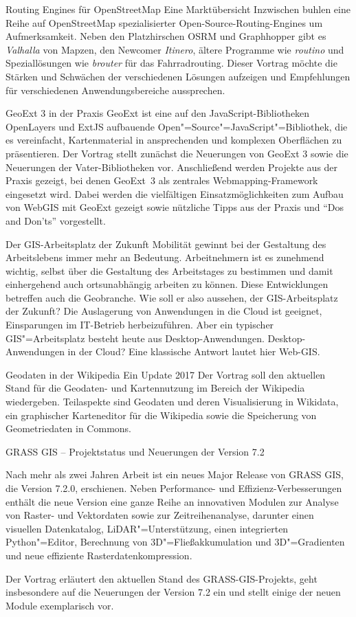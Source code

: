 %
{Routing Engines für OpenStreetMap}%
{Eine Marktübersicht}%
{Inzwischen buhlen eine Reihe auf OpenStreetMap spezialisierter Open-Source-Routing-Engines um
Aufmerksamkeit. Neben den Platzhirschen OSRM und Graphhopper gibt es \emph{Valhalla} von Mapzen, den
Newcomer \emph{Itinero}, ältere Programme wie \emph{routino} und Speziallösungen wie \emph{brouter} für das
Fahrradrouting. Dieser Vortrag möchte die Stärken und Schwächen der verschiedenen Lösungen aufzeigen
und Empfehlungen für verschiedenen Anwendungsbereiche aussprechen.}



%
{GeoExt 3 in der Praxis}%
{}%
{GeoExt ist eine auf den JavaScript-Bibliotheken Open\-Lay\-ers und ExtJS aufbauende
  Open"=Source"=JavaScript"=Bibliothek, die es vereinfacht, Kartenmaterial in ansprechenden und komplexen
  Oberflächen zu präsentieren.  Der Vortrag stellt zunächst die Neuerungen von GeoExt 3 sowie die
  Neuerungen der Vater-Bibliotheken
vor.  Anschließend werden Projekte aus der Praxis gezeigt, bei denen GeoExt~3 als zentrales
Webmapping-Framework eingesetzt wird. Dabei werden die vielfältigen Einsatzmöglichkeiten zum Aufbau
von WebGIS mit GeoExt gezeigt sowie nützliche Tipps aus der Praxis und "`Dos and Don'ts"'
vorgestellt.}

%
{Der GIS-Arbeitsplatz der Zukunft}%
{}%
{Mobilität gewinnt bei der Gestaltung des Arbeitslebens immer mehr an Bedeutung. Arbeitnehmern ist
es zunehmend wichtig, selbst über die Gestaltung des Arbeitstages zu bestimmen und damit
einhergehend auch ortsunabhängig arbeiten zu können. Diese Entwicklungen betreffen auch die
Geobranche. Wie soll er also aussehen, der GIS-Arbeitsplatz der Zukunft?  Die Auslagerung von
Anwendungen in die Cloud ist geeignet, Einsparungen im IT-Betrieb herbeizuführen. Aber ein typischer
GIS"=Arbeitsplatz besteht heute aus Desktop-Anwendungen. Desktop-Anwendungen in der Cloud? Eine
klassische Antwort lautet hier Web-GIS.}

%
{Geodaten in der Wikipedia}%
{Ein Update 2017}%
{Der Vortrag soll den aktuellen Stand für die Geodaten- und Kartennutzung im Bereich der Wikipedia
wiedergeben. Teilaspekte sind Geodaten und deren Visualisierung in Wikidata, ein graphischer
Karteneditor für die Wikipedia sowie die Speicherung von Geometriedaten in Commons.  }


%
{GRASS GIS -- Projektstatus und Neuerungen der Version 7.2}%
{}%
{Nach mehr als zwei Jahren Arbeit ist ein neues Major Release von GRASS GIS, die Version 7.2.0,
erschienen. Neben Performance- und Effizienz-Verbesserungen enthält die neue Version eine ganze
Reihe an innovativen Modulen zur Analyse von Raster- und Vektordaten sowie zur Zeitreihenanalyse,
darunter einen visuellen Datenkatalog, LiDAR"=Unterstützung, einen integrierten Python"=Editor,
Berechnung von 3D"=Fließakkumulation und 3D"=Gradienten
und neue effiziente Rasterdatenkompression.

Der Vortrag erläutert den aktuellen Stand des GRASS-GIS-Projekts, geht insbesondere auf die
Neuerungen der Version 7.2 ein und stellt einige der neuen Module exemplarisch vor.
}


